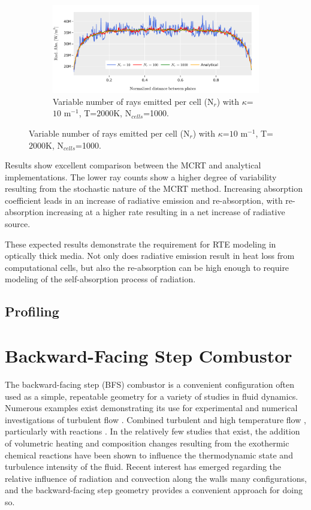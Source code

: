 \begin{figure}
  \begin{subfigure}{1\textwidth}
  \includegraphics[width=\linewidth]{figures/ch4/PPcomparison3.png}
  \caption{Variable number of rays emitted per cell (N$_r$) with $\kappa{}$=$10$ m$^{-1}$, T=$2000$K, N$_{cells}$=1000.}
  \label{fig:PPcom_nrays}
  \end{subfigure}
  \label{fig:PPcomp}
\end{figure}

Results show excellent comparison between the MCRT and analytical implementations. 
The lower ray counts show a higher degree of variability resulting from the stochastic nature of the MCRT method. 
Increasing absorption coefficient leads in an increase of radiative emission and re-absorption, with re-absorption increasing at a higher rate resulting in a net increase of radiative source.

These expected results demonstrate the requirement for RTE modeling in optically thick media. Not only does radiative emission result in heat loss from computational cells, but also the re-absorption can be high enough to require modeling of the self-absorption process of radiation.

\subsection{Profiling}


\section{Backward-Facing Step Combustor}
The backward-facing step (BFS) combustor is a convenient configuration often used as a simple, repeatable geometry for a variety of studies in fluid dynamics.
Numerous examples exist demonstrating its use for experimental and numerical investigations of turbulent flow \cite{Armaly1983ExperimentalFlow,Neto1993AStep,Jovic1994Backward-facing5000,Le1997DirectStep}. Combined turbulent and high temperature flow \cite{Niemann2016Buoyancy-affectedNumber,Xie2017GeometrySteps}, particularly with reactions \cite{Pouech2021PremixedStep}.
In the relatively few studies that exist, the addition of volumetric heating and composition changes resulting from the exothermic chemical reactions have been shown to influence the thermodynamic state and turbulence intensity of the fluid. Recent interest has emerged regarding the relative influence of radiation and convection along the walls many configurations, and the backward-facing step geometry provides a convenient approach for doing so.

